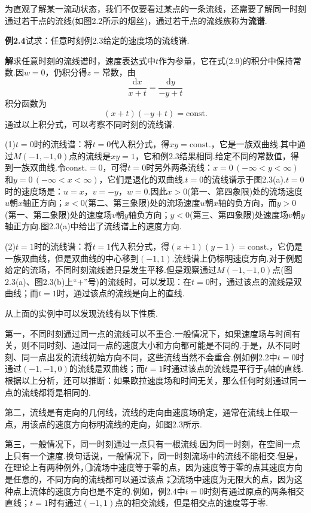 为直观了解某一流动状态，我们不仅要看过某点的一条流线，还需要了解同一时刻通过若干点的流线(如图2.2所示的烟丝)，通过若干点的流线族称为\textbf{流谱}.

\noindent\textbf{例2.4}\quad 试求：任意时刻例2.3给定的速度场的流线谱.

\noindent\textbf{解}\quad 求任意时刻的流线谱时，速度表达式中$t$作为参量，它在式(2.9)的积分中保持常数.因$w=0$，仍积分得$z=$常数，由
\[
\frac{\mathrm{d}x}{x+t}=\frac{\mathrm{d}y}{-y+t}
\]
积分函数为
\[
(x+t)(-y+t)=\mathrm{const.}
\]
通过以上积分式，可以考察不同时刻的流线谱.

(1)$t=0$时的流线谱：将$t=0$代入积分式，得$xy=\mathrm{const.}$，它是一族双曲线.其中通过$M(-1,-1,0)$点的流线是$xy=1$，它和例2.3结果相同.给定不同的常数值，得到一族双曲线.令const.$=0$，可得$t=0$时另外两条流线：$x=0\,(-\infty<y<\infty)$和$y=0\,(-\infty<x<\infty)$，它们是退化的双曲线.$t=0$的流线谱示于图2.3(a).$t=0$时的速度场是：$u=x$，$v=-y$，$w=0$.因此$x>0$(第一、第四象限)处的流场速度$u$朝$x$轴正方向；$x<0$(第二、第三象限)处的流场速度$u$朝$x$轴的负方向，而$y>0$(第一、第二象限)处的速度场$v$朝$y$轴负方向；$y<0$(第三、第四象限)处速度场$v$朝$y$轴正方向.图2.3(a)中给出了流线谱上的速度方向.

(2)$t=1$时的流线谱：将$t=1$代入积分式，得$(x+1)(y-1)=\mathrm{const.}$，它仍是一族双曲线，但是双曲线的中心移到$(-1,1)$.流线谱上仍标明速度方向.对于例题给定的流场，不同时刻流线谱只是发生平移.但是观察通过$M(-1,-1,0)$点(图2.3(a)、图2.3(b)上“$+$”号)的流线时，可以发现：在$t=0$时，通过该点的流线是双曲线；而$t=1$时，通过该点的流线是向上的直线.

从上面的实例中可以发现流线有以下性质.

第一，不同时刻通过同一点的流线可以不重合.一般情况下，如果速度场与时间有关，则不同时刻、通过同一点的速度大小和方向都可能是不同的.于是，从不同时刻、同一点出发的流线初始方向不同，这些流线当然不会重合.例如例2.2中$t=0$时通过$(-1,-1,0)$的流线是双曲线；而$t=1$时通过该点的流线是平行于$y$轴的直线.根据以上分析，还可以推断：如果欧拉速度场和时间无关，那么任何时刻通过同一点的流线都将是相同的.

第二，流线是有走向的几何线，流线的走向由速度场确定，通常在流线上任取一点，用该点的速度方向标明流线的走向，如图2.3所示.

第三，一般情况下，同一时刻通过一点只有一根流线.因为同一时刻，在空间一点上只有一个速度.换句话说，一般情况下，同一时刻流场中的流线不能相交.但是，在理论上有两种例外，\textcircled{1}流场中速度等于零的点，因为速度等于零的点其速度方向是任意的，不同方向的流线都可以通过该点；\textcircled{2}流场中速度为无限大的点，因为这种点上流体的速度方向也是不定的.例如，例2.4中$t=0$时刻有通过原点的两条相交直线；$t=1$时有通过$(-1,1)$点的相交流线，但是相交点的速度等于零.

